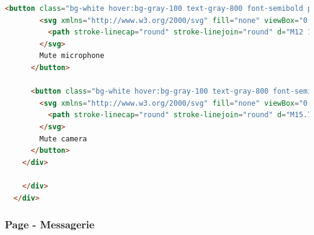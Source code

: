 \documentclass[12pt, a4paper, oneside]{thesis}
\begin{document}
\begin{lstlisting}[language=HTML, caption={Page - Réunions}, label=Page - Reunions]
      <button class="bg-white hover:bg-gray-100 text-gray-800 font-semibold py-2 px-4 border border-gray-400 rounded shadow flex items-center" id="toggle-mic-button" data-astro-cid-j7pv25f6="">
        <svg xmlns="http://www.w3.org/2000/svg" fill="none" viewBox="0 0 24 24" stroke-width="1.5" stroke="currentColor" class="w-6 h-6 mr-2" data-astro-cid-j7pv25f6="">
          <path stroke-linecap="round" stroke-linejoin="round" d="M12 18.75a6 6 0 006-6v-1.5m-6 7.5a6 6 0 01-6-6v-1.5m6 7.5v3.75m-3.75 0h7.5M12 15.75a3 3 0 01-3-3V4.5a3 3 0 116 0v8.25a3 3 0 01-3 3z" data-astro-cid-j7pv25f6=""></path>
        </svg>
        Mute microphone
      </button>
    
      <button class="bg-white hover:bg-gray-100 text-gray-800 font-semibold py-2 px-4 border border-gray-400 rounded shadow flex items-center" id="toggle-camera-button" data-astro-cid-j7pv25f6="">
        <svg xmlns="http://www.w3.org/2000/svg" fill="none" viewBox="0 0 24 24" stroke-width="1.5" stroke="currentColor" class="w-6 h-6 mr-2" data-astro-cid-j7pv25f6="">
          <path stroke-linecap="round" stroke-linejoin="round" d="M15.75 10.5l4.72-4.72a.75.75 0 011.28.53v11.38a.75.75 0 01-1.28.53l-4.72-4.72M12 18.75H4.5a2.25 2.25 0 01-2.25-2.25V9m12.841 9.091L16.5 19.5m-1.409-1.409c.407-.407.659-.97.659-1.591v-9a2.25 2.25 0 00-2.25-2.25h-9c-.621 0-1.184.252-1.591.659m12.182 12.182L2.909 5.909M1.5 4.5l1.409 1.409" data-astro-cid-j7pv25f6=""></path>
        </svg>
        Mute camera
      </button>
    </div>
  
    </div>
  </div>

\end{lstlisting}

\newpage

\subsubsection{Page - Messagerie}
\end{document}
